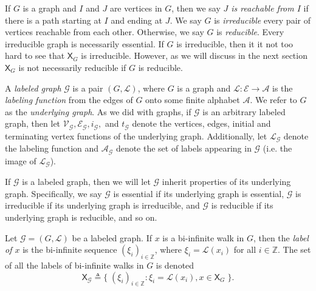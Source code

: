 \documentclass[hidelinks]{article}
\newcommand{\Ac}{\mathcal{A}}  %
\newcommand{\Lc}{\mathcal{L}}  %
\newcommand{\Gc}{\mathcal{G}}  %
\newcommand{\Vc}{\mathcal{V}}
\newcommand{\Ec}{\mathcal{E}}
\newcommand{\shift}[1]{\mathsf{X}_{#1}}
\newcommand{\term}[1]{\textit{#1}}
\theoremstyle{definition}
\begin{document}
If \(G\) is a graph and \(I\) and \(J\)
are vertices in \(G\), then we say \term{\(J\) is reachable from \(I\)}
if there is a path starting at \(I\) and ending at \(J\). We say \(G\) is \term{irreducible}
every pair of vertices reachable from each other. Otherwise, we say \(G\) is \term{reducible}. 
Every irreducible graph is necessarily essential. If \(G\) is irreducible, then 
it it not too hard to see that \(\shift{G}\) is irreducible. However, 
as we will discuss in the next section \(\shift{G}\) is not necessarily reducible 
if \(G\) is reducible.

\begin{definition}
    A \term{labeled graph} \(\Gc\) is a pair \((G, \Lc)\), where \(G\) is a graph and \(\Lc : \Ec \to \Ac\) is the 
    \term{labeling function} from the edges of \(G\) onto some finite alphabet \(\Ac\). We 
    refer to \(G\) as the \term{underlying graph}.
    As we did with graphs, if \(\Gc\) is an arbitrary labeled graph, then 
    let \(\Vc_\Gc, \Ec_\Gc, i_\Gc,\) and \(t_\Gc\) denote the vertices, edges, 
    initial and terminating vertex functions of the underlying graph. Additionally,
    let \(\Lc_\Gc\) denote the labeling function and \(\Ac_\Gc\) denote the set 
    of labels appearing in \(\Gc\) (i.e. the image of \(\Lc_\Gc\)).

\end{definition}

If \(\Gc\) is a labeled graph, then we will let \(\Gc\) inherit properties of its underlying 
graph. Specifically, we say \(\Gc\) is essential if its underlying graph is essential, 
\(\Gc\) is irreducible if its underlying graph is irreducible, and \(\Gc\) is reducible 
if its underlying graph is reducible, and so on. 

\begin{definition}
    Let \(\Gc = (G, \Lc)\) be a labeled graph. If \(x\) is a bi-infinite walk in \(G\), 
    then the \term{label of \(x\)} is the bi-infinite sequence \((\xi_i)_{i \in \mathbb{Z}}\), 
    where \(\xi_i = \Lc(x_i)\) for all \(i \in \mathbb{Z}\). The set of all the labels of 
    bi-infinite walks in \(G\) is denoted
    \[\shift{\Gc} \triangleq \big\{ \; (\xi_i)_{i \in \mathbb{Z}} : \xi_i = \Lc(x_i), x \in \shift{G} \; \big\}.  \]
\end{definition}
\end{document}
